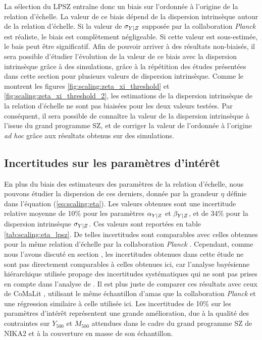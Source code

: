 La sélection du LPSZ entraîne donc un biais sur l'ordonnée à l'origine de la relation d'échelle.
La valeur de ce biais dépend de la dispersion intrinsèque autour de la relation d'échelle.
Si la valeur de $\sigma_{Y|Z}$ supposée par la collaboration \textit{Planck} \cite{planck_collaboration_planck_2011} est réaliste, le biais est complètement négligeable.
Si cette valeur est sous-estimée, le bais peut être significatif.
Afin de pouvoir arriver à des résultats non-biaisés, il sera possible d'étudier l'évolution de la valeur de ce biais avec la dispersion intrinsèque grâce à des simulations, grâce à la répétition des études présentées dans cette section pour plusieurs valeurs de dispersion intrinsèque.
Comme le montrent les figures \ref{fig:scaling:zeta_xi_threshold} et \ref{fig:scaling:zeta_xi_threshold_2}, les estimations de la dispersion intrinsèque de la relation d'échelle ne sont pas biaisées pour les deux valeurs testées.
Par conséquent, il sera possible de connaître la valeur de la dispersion intrinsèque à l'issue du grand programme SZ, et de corriger la valeur de l'ordonnée à l'origine \textit{ad hoc} grâce aux résultats obtenus sur des simulations.

\subsection{Incertitudes sur les paramètres d'intérêt}

En plus du biais des estimateurs des paramètres de la relation d'échelle, nous pouvons étudier la dispersion de ces derniers, donnée par la grandeur $\eta$ définie dans l'équation (\ref{eq:scaling:eta}).
Les valeurs obtenues sont une incertitude relative moyenne de 10\% pour les paramètres $\alpha_{Y|Z}$ et $\beta_{Y|Z}$, et de 34\% pour la dispersion intrinsèque $\sigma_{Y|Z}$.
Ces valeurs sont reportées en table \ref{tab:scaling:eta_lpsz}.
De telles incertitudes sont comparables avec celles obtenues pour la même relation d'échelle par la collaboration \textit{Planck} \cite{planck_collaboration_planck_2011}.
Cependant, comme nous l'avons discuté en section , les incertitudes obtenues dans cette étude ne sont pas directement comparables à celles obtenues ici, car l'analyse bayésienne hiérarchique utilisée propage des incertitudes systématiques qui ne sont pas prises en compte dans l'analyse de \cite{planck_collaboration_planck_2011}.
Il est plus juste de comparer ces résultats avec ceux de CoMaLit \cite{sereno_comparing_2015}, utilisant le même échantillon d'amas que la collaboration \textit{Planck} et une régression similaire à celle utilisée ici.
Les incertitudes de 10\% sur les paramètres d'intérêt représentent une grande amélioration, due à la qualité des contraintes sur $Y_{500}$ et $M_{500}$ attendues dans le cadre du grand programme SZ de NIKA2 et à la couverture en masse de son échantillon.

